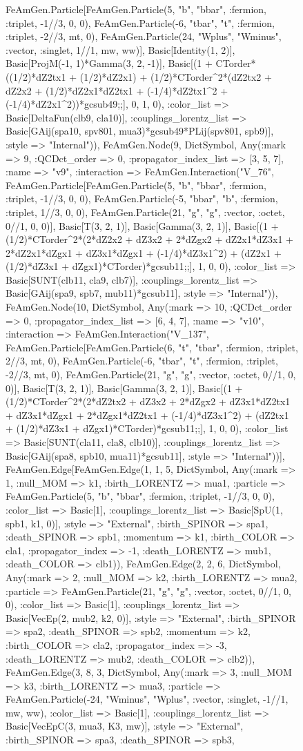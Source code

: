 \documentclass{revtex4}
\begin{document}
\begin{figure}[!htb]
\begin{center}
{FeAmGen.Particle[FeAmGen.Particle(5, "b", "bbar", :fermion, :triplet, -1//3, 0, 0), FeAmGen.Particle(-6, "tbar", "t", :fermion, :triplet, -2//3, mt, 0), FeAmGen.Particle(24, "Wplus", "Wminus", :vector, :singlet, 1//1, mw, ww)], Basic[Identity(1, 2)], Basic[ProjM(-1, 1)*Gamma(3, 2, -1)], Basic[(1 + CTorder*((1/2)*dZ2tx1 + (1/2)*dZ2x1) + (1/2)*CTorder^2*(dZ2tx2 + dZ2x2 + (1/2)*dZ2x1*dZ2tx1 + (-1/4)*dZ2tx1^2 + (-1/4)*dZ2x1^2))*gcsub49;;], 0, 1, 0), :color_list => Basic[DeltaFun(clb9, cla10)], :couplings_lorentz_list => Basic[GAij(spa10, spv801, mua3)*gcsub49*PLij(spv801, spb9)], :style => "Internal")), FeAmGen.Node(9, Dict{Symbol, Any}(:mark => 9, :QCDct_order => 0, :propagator_index_list => [3, 5, 7], :name => "v9", :interaction => FeAmGen.Interaction("V_76", FeAmGen.Particle[FeAmGen.Particle(5, "b", "bbar", :fermion, :triplet, -1//3, 0, 0), FeAmGen.Particle(-5, "bbar", "b", :fermion, :triplet, 1//3, 0, 0), FeAmGen.Particle(21, "g", "g", :vector, :octet, 0//1, 0, 0)], Basic[T(3, 2, 1)], Basic[Gamma(3, 2, 1)], Basic[(1 + (1/2)*CTorder^2*(2*dZ2x2 + dZ3x2 + 2*dZgx2 + dZ2x1*dZ3x1 + 2*dZ2x1*dZgx1 + dZ3x1*dZgx1 + (-1/4)*dZ3x1^2) + (dZ2x1 + (1/2)*dZ3x1 + dZgx1)*CTorder)*gcsub11;;], 1, 0, 0), :color_list => Basic[SUNT(clb11, cla9, clb7)], :couplings_lorentz_list => Basic[GAij(spa9, spb7, mub11)*gcsub11], :style => "Internal")), FeAmGen.Node(10, Dict{Symbol, Any}(:mark => 10, :QCDct_order => 0, :propagator_index_list => [6, 4, 7], :name => "v10", :interaction => FeAmGen.Interaction("V_137", FeAmGen.Particle[FeAmGen.Particle(6, "t", "tbar", :fermion, :triplet, 2//3, mt, 0), FeAmGen.Particle(-6, "tbar", "t", :fermion, :triplet, -2//3, mt, 0), FeAmGen.Particle(21, "g", "g", :vector, :octet, 0//1, 0, 0)], Basic[T(3, 2, 1)], Basic[Gamma(3, 2, 1)], Basic[(1 + (1/2)*CTorder^2*(2*dZ2tx2 + dZ3x2 + 2*dZgx2 + dZ3x1*dZ2tx1 + dZ3x1*dZgx1 + 2*dZgx1*dZ2tx1 + (-1/4)*dZ3x1^2) + (dZ2tx1 + (1/2)*dZ3x1 + dZgx1)*CTorder)*gcsub11;;], 1, 0, 0), :color_list => Basic[SUNT(cla11, cla8, clb10)], :couplings_lorentz_list => Basic[GAij(spa8, spb10, mua11)*gcsub11], :style => "Internal"))], FeAmGen.Edge[FeAmGen.Edge(1, 1, 5, Dict{Symbol, Any}(:mark => 1, :null_MOM => k1, :birth_LORENTZ => mua1, :particle => FeAmGen.Particle(5, "b", "bbar", :fermion, :triplet, -1//3, 0, 0), :color_list => Basic[1], :couplings_lorentz_list => Basic[SpU(1, spb1, k1, 0)], :style => "External", :birth_SPINOR => spa1, :death_SPINOR => spb1, :momentum => k1, :birth_COLOR => cla1, :propagator_index => -1, :death_LORENTZ => mub1, :death_COLOR => clb1)), FeAmGen.Edge(2, 2, 6, Dict{Symbol, Any}(:mark => 2, :null_MOM => k2, :birth_LORENTZ => mua2, :particle => FeAmGen.Particle(21, "g", "g", :vector, :octet, 0//1, 0, 0), :color_list => Basic[1], :couplings_lorentz_list => Basic[VecEp(2, mub2, k2, 0)], :style => "External", :birth_SPINOR => spa2, :death_SPINOR => spb2, :momentum => k2, :birth_COLOR => cla2, :propagator_index => -3, :death_LORENTZ => mub2, :death_COLOR => clb2)), FeAmGen.Edge(3, 8, 3, Dict{Symbol, Any}(:mark => 3, :null_MOM => k3, :birth_LORENTZ => mua3, :particle => FeAmGen.Particle(-24, "Wminus", "Wplus", :vector, :singlet, -1//1, mw, ww), :color_list => Basic[1], :couplings_lorentz_list => Basic[VecEpC(3, mua3, K3, mw)], :style => "External", :birth_SPINOR => spa3, :death_SPINOR => spb3, }
\end{center}
\end{figure}
\end{document}
